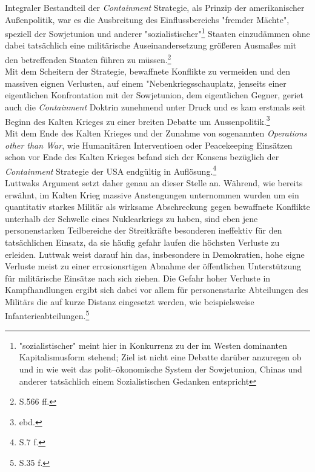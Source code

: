 \documentclass[11pt,a4paper,oneside,numbers=noenddot,bibliography=totocnumbered,DIV=13]{scrartcl}
\begin{document}
Integraler Bestandteil der \textit{Containment} Strategie, als Prinzip der  amerikanischer Außenpolitik, war es die Ausbreitung des Einflussbereichs "fremder Mächte", speziell der Sowjetunion und anderer "sozialistischer"\footnote{"sozialistischer" meint hier in Konkurrenz zu der im Westen dominanten Kapitalismusform stehend; Ziel ist nicht eine Debatte darüber anzuregen ob und in wie weit das polit--ökonomische System der Sowjetunion, Chinas und anderer tatsächlich einem Sozialistischen Gedanken entspricht} Staaten einzudämmen ohne dabei tatsächlich eine militärische Auseinandersetzung größeren Ausmaßes mit den betreffenden Staaten führen zu müssen.\footnote{\cite{olson_war_2007}S.566 ff.}\\         
Mit dem Scheitern der Strategie, bewaffnete Konflikte zu vermeiden und den massiven eignen Verlusten, auf einem "Nebenkriegsschauplatz, jenseits einer eigentlichen Konfrontation mit der Sowjetunion, dem eigentlichen Gegner, geriet auch die \textit{Containment} Doktrin zunehmend unter Druck und es kam erstmals seit Beginn des Kalten Krieges zu einer breiten Debatte um Aussenpolitik.\footnote{ebd.}\\
Mit dem Ende des Kalten Krieges und der Zunahme von sogenannten \textit{Operations other than War}, wie Humanitären Interventioen oder Peacekeeping Einsätzen schon vor Ende des Kalten Krieges befand sich der Konsens bezüglich der \textit{Containment} Strategie der USA endgültig in Auflösung.\footnote{\cite{coker_postmodern_2008}S.7 f.}\\
Luttwaks Argument setzt daher genau an dieser Stelle an. Während, wie bereits erwähnt, im Kalten Krieg massive Anstengungen unternommen wurden um ein quantitativ starkes Militär als wirksame Abschreckung gegen bewaffnete Konflikte unterhalb der Schwelle eines Nuklearkriegs zu haben, sind eben jene personenstarken Teilbereiche der Streitkräfte besonderen ineffektiv für den tatsächlichen Einsatz, da sie häufig gefahr laufen die höchsten Verluste zu erleiden. Luttwak weist darauf hin das, insbesondere in Demokratien, hohe eigne Verluste meist zu einer errosionsrtigen Abnahme der öffentlichen Unterstützung für militärische Einsätze nach sich ziehen. Die Gefahr hoher Verluste in Kampfhandlungen ergibt sich dabei vor allem für personenstarke  Abteilungen des Militärs die auf kurze Distanz eingesetzt werden, wie beispielsweise Infanterieabteilungen.\footnote{\cite{Luttwak1996}S.35 f.}\\
\end{document}
